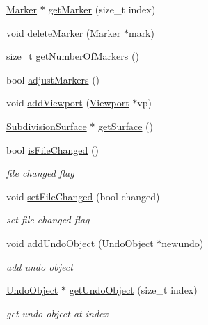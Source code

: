 \begin{DoxyCompactItemize}
\item 
\hyperlink{classShipCAD_1_1Marker}{Marker} $\ast$ \hyperlink{classShipCAD_1_1ShipCADModel_aedbe32ff0770186f6c565e2a978fcf14}{get\-Marker} (size\-\_\-t index)
\item 
void \hyperlink{classShipCAD_1_1ShipCADModel_a8c8e92902f8e90e77258c9a872e1dee8}{delete\-Marker} (\hyperlink{classShipCAD_1_1Marker}{Marker} $\ast$mark)
\item 
size\-\_\-t \hyperlink{classShipCAD_1_1ShipCADModel_a998b89ce2d09ff41318dc1b379c1740c}{get\-Number\-Of\-Markers} ()
\item 
bool \hyperlink{classShipCAD_1_1ShipCADModel_aa4deb5e9df2dcebf4576e79520cb1b9e}{adjust\-Markers} ()
\item 
void \hyperlink{classShipCAD_1_1ShipCADModel_a6d868bbb71f72c46e6827adeed8afc4b}{add\-Viewport} (\hyperlink{classShipCAD_1_1Viewport}{Viewport} $\ast$vp)
\item 
\hyperlink{classShipCAD_1_1SubdivisionSurface}{Subdivision\-Surface} $\ast$ \hyperlink{classShipCAD_1_1ShipCADModel_a6941ad7a2b167419e844823fa8461019}{get\-Surface} ()
\item 
bool \hyperlink{classShipCAD_1_1ShipCADModel_a2cf41d2e7463763c81c7850fe953437e}{is\-File\-Changed} ()
\begin{DoxyCompactList}\small\item\em file changed flag \end{DoxyCompactList}\item 
void \hyperlink{classShipCAD_1_1ShipCADModel_a98ebcb64c5c759cbd0ae6e817b7168b2}{set\-File\-Changed} (bool changed)
\begin{DoxyCompactList}\small\item\em set file changed flag \end{DoxyCompactList}\item 
void \hyperlink{classShipCAD_1_1ShipCADModel_ab79232c9ce03bda04f47ff614f87cea4}{add\-Undo\-Object} (\hyperlink{classShipCAD_1_1UndoObject}{Undo\-Object} $\ast$newundo)
\begin{DoxyCompactList}\small\item\em add undo object \end{DoxyCompactList}\item 
\hyperlink{classShipCAD_1_1UndoObject}{Undo\-Object} $\ast$ \hyperlink{classShipCAD_1_1ShipCADModel_a0acb4ae206e2caee0f87ebd229b7c90b}{get\-Undo\-Object} (size\-\_\-t index)
\begin{DoxyCompactList}\small\item\em get undo object at index \end{DoxyCompactList}\item 

\end{DoxyCompactItemize}
